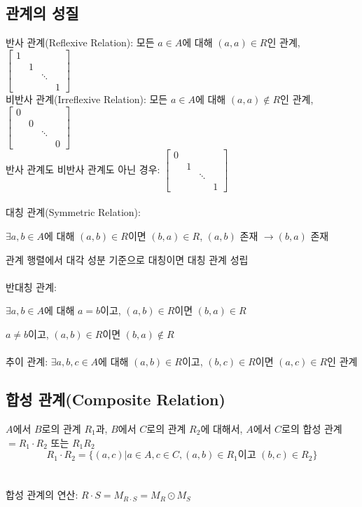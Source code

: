 \subsection{관계의 성질}
반사 관계(Reflexive Relation): 모든 $a \in A$에 대해 $(a, a) \in R$인 관계, 
$\begin{bmatrix}
    1 &   &   &  \\
      & 1 &   &  \\
      &   & \ddots &\\
      &   &   & 1
\end{bmatrix}$\\
비반사 관계(Irreflexive Relation): 모든 $a \in A$에 대해 $(a, a) \not\in R$인 관계,
$\begin{bmatrix}
    0 &   &   &  \\
      & 0 &   &  \\
      &   & \ddots &\\
      &   &   & 0
\end{bmatrix}$\\
반사 관계도 비반사 관계도 아닌 경우: $\begin{bmatrix}
    0 &   &   &  \\
        & 1 &   &  \\
        &   & \ddots &\\
        &   &   & 1
\end{bmatrix}$\\\\
대칭 관계(Symmetric Relation):

$\exists a, b \in A$에 대해 $(a, b) \in R$이면 $(b, a) \in R$, $(a, b)$ 존재 $\to (b, a)$ 존재

관계 행렬에서 대각 성분 기준으로 대칭이면 대칭 관계 성립\\\\
반대칭 관계:

$\exists a, b \in A$에 대해 $a = b$이고, $(a, b) \in R$이면 $(b, a) \in R$

$a \neq b$이고, $(a, b) \in R$이면 $(b, a) \not\in R$\\\\
추이 관계: $\exists a, b, c \in A$에 대해 $(a, b) \in R$이고, $(b, c) \in R$이면 $(a, c) \in R$인 관계

\newpage
\subsection{합성 관계(Composite Relation)}
$A$에서 $B$로의 관계 $R_1$과, $B$에서 $C$로의 관계 $R_2$에 대해서, $A$에서 $C$로의 합성 관계 $= R_1 \cdot R_2$ 또는 $R_1 R_2$
$$R_1 \cdot R_2 = \{(a, c) | a \in A, c \in C, (a, b) \in R_1\text{이고 }(b, c) \in R_2\}$$
\\\\
합성 관계의 연산: $R \cdot S = M_{R \cdot S} = M_R \odot M_S$

